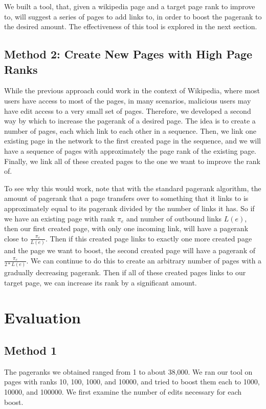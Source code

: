 \documentclass{article}
\begin{document}
We built a tool, that, given a wikipedia page and a target page rank to improve
to, will suggest a series of pages to add links to, in order to boost the
pagerank to the desired amount. The effectiveness of this tool is explored in
the next section.

\subsection*{Method 2: Create New Pages with High Page Ranks}

While the previous approach could work in the context of Wikipedia, where most
users have access to most of the pages, in many scenarios, malicious users may
have edit access to a very small set of pages. Therefore, we developed a second
way by which to increase the pagerank of a desired page. The idea is to create a
number of pages, each which link to each other in a sequence. Then, we link one
existing page in the network to the first created page in the sequence, and we
will have a sequence of pages with approximately the page rank of the existing
page. Finally, we link all of these created pages to the one we want to improve
the rank of.

To see why this would work, note that with the standard pagerank algorithm, the
amount of pagerank that a page transfers over to something that it links to is
approximately equal to its pagerank divided by the number of links it has. So if
we have an existing page with rank $\pi_e$ and number of outbound links $L(e)$,
then our first created page, with only one incoming link, will have a pagerank
close to $\frac{\pi_e}{L(e)}$. Then if this created page links to exactly one
more created page and the page we want to boost, the second created page will
have a pagerank of $\frac{\pi_e}{2*L(e)}$. We can continue to do this to create
an arbitrary number of pages with a gradually decreasing pagerank. Then if all
of these created pages links to our target page, we can increase its rank by a
significant amount.

\section*{Evaluation}

\subsection*{Method 1}

The pageranks we obtained ranged from 1 to about 38,000. We ran our tool on
pages with ranks 10, 100, 1000, and 10000, and tried to boost
them each to 1000, 10000, and 100000. We first examine the number of edits necessary for each boost. \\
\end{document}
